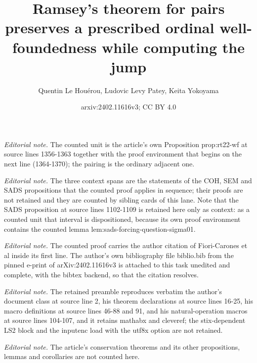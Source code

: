 \documentclass{article}
\title{Ramsey's theorem for pairs preserves a prescribed ordinal well-foundedness while computing the jump}
\author{Quentin Le Houérou, Ludovic Levy Patey, Keita Yokoyama}
\date{arxiv:2402.11616v3; CC BY 4.0}
\numberwithin{theorem}{section}
\begin{document}
\maketitle
\noindent\textit{Editorial note.} The counted unit is the article's own Proposition prop:rt22-wf at source lines 1356-1363 together with the proof environment that begins on the next line (1364-1370); the pairing is the ordinary adjacent one.\par\medskip
\noindent\textit{Editorial note.} The three context spans are the statements of the COH, SEM and SADS propositions that the counted proof applies in sequence; their proofs are not retained and they are counted by sibling cards of this lane. Note that the SADS proposition at source lines 1102-1109 is retained here only as context: as a counted unit that interval is dispositioned, because its own proof environment contains the counted lemma lem:sads-forcing-question-sigma01.\par\medskip
\noindent\textit{Editorial note.} The counted proof carries the author citation of Fiori-Carones et al inside its first line. The author's own bibliography file biblio.bib from the pinned e-print of arXiv:2402.11616v3 is attached to this task unedited and complete, with the bibtex backend, so that the citation resolves.\par\medskip
\noindent\textit{Editorial note.} The retained preamble reproduces verbatim the author's document class at source line 2, his theorem declarations at source lines 16-25, his macro definitions at source lines 46-88 and 91, and his natural-operation macros at source lines 104-107, and it retains mathabx and cleveref; the stix-dependent LS2 block and the inputenc load with the utf8x option are not retained.\par\medskip
\noindent\textit{Editorial note.} The article's conservation theorems and its other propositions, lemmas and corollaries are not counted here.\par\medskip
\end{document}
